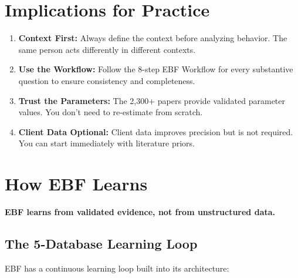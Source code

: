 \section{Implications for Practice}
\label{sec:ref-ebf-practice}

\begin{tcolorbox}[colback=green!5!white, colframe=green!75!black,
    title=Practical Implications]
\begin{enumerate}
\item \textbf{Context First:} Always define the context before analyzing behavior.
      The same person acts differently in different contexts.
\item \textbf{Use the Workflow:} Follow the 8-step EBF Workflow for every
      substantive question to ensure consistency and completeness.
\item \textbf{Trust the Parameters:} The 2,300+ papers provide validated
      parameter values. You don't need to re-estimate from scratch.
\item \textbf{Client Data Optional:} Client data improves precision but is
      not required. You can start immediately with literature priors.
\end{enumerate}
\end{tcolorbox}


\section{How EBF Learns}
\label{sec:ref-ebf-learning}

\begin{tcolorbox}[colback=yellow!5!white, colframe=yellow!75!black,
    title=The Learning Principle]
\textbf{EBF learns from validated evidence, not from unstructured data.}
\end{tcolorbox}

\subsection{The 5-Database Learning Loop}

EBF has a continuous learning loop built into its architecture:

